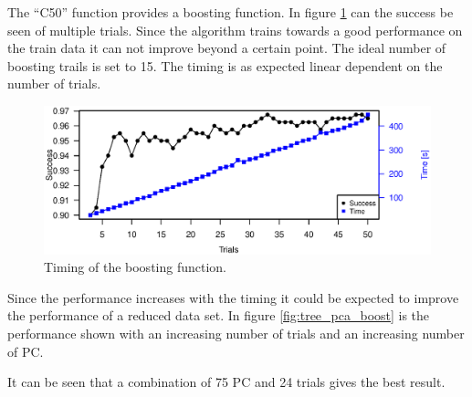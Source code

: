 The ``C50'' function provides a boosting function.
In figure \ref{fig:tree_timing} can the success be seen of multiple trials.
Since the algorithm trains towards a good performance on the train data it can not improve beyond a certain point.
The ideal number of boosting trails is set to 15.
The timing is as expected linear dependent on the number of trials.

\begin{figure}[H]
\includegraphics[width = \textwidth]{graphics/tree_timing_one}
\caption[Timing of the boosting function.]{Timing of the boosting function.}
\label{fig:tree_timing}
\end{figure}

Since the performance increases with the timing it could be expected to improve the performance of a reduced data set.
In figure \ref{fig:tree_pca_boost} is the performance shown with an increasing number of trials and an increasing number of PC.

It can be seen that a combination of 75 PC and 24 trials gives the best result.


